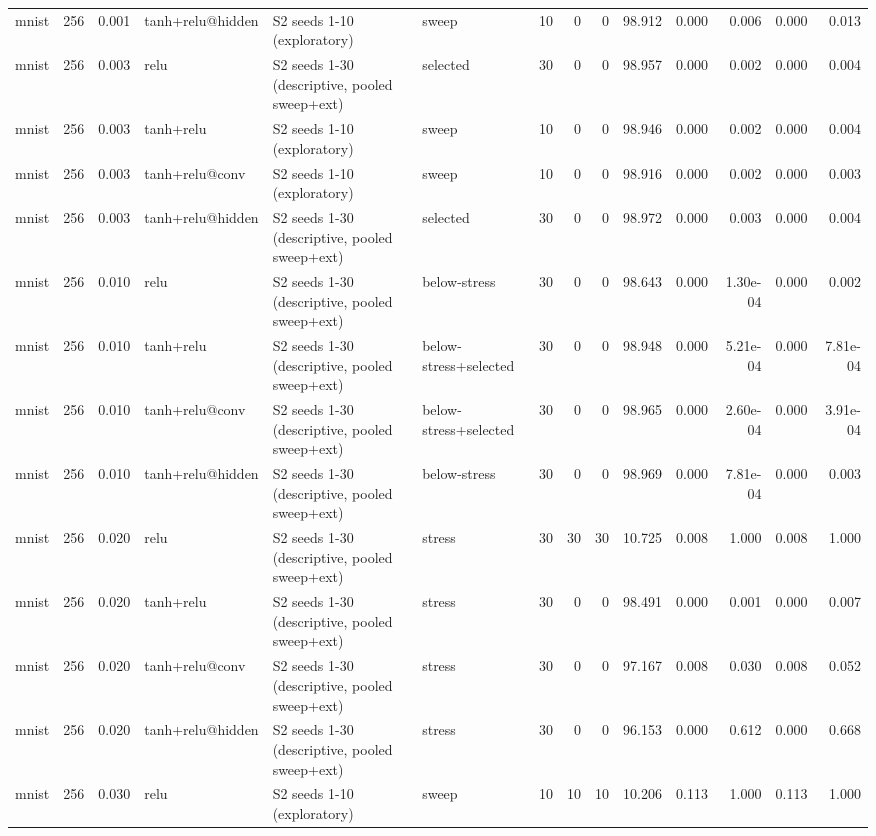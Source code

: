 \begin{table}[htbp]
{\begin{tabular}{@{}lrrlllrrrrrrrr@{}}
mnist & 256 & 0.001 & tanh+relu@hidden & S2 seeds 1-10 (exploratory) & sweep & 10 & 0 & 0 & 98.912 & 0.000 & 0.006 & 0.000 & 0.013 \\
mnist & 256 & 0.003 & relu & S2 seeds 1-30 (descriptive, pooled sweep+ext) & selected & 30 & 0 & 0 & 98.957 & 0.000 & 0.002 & 0.000 & 0.004 \\
mnist & 256 & 0.003 & tanh+relu & S2 seeds 1-10 (exploratory) & sweep & 10 & 0 & 0 & 98.946 & 0.000 & 0.002 & 0.000 & 0.004 \\
mnist & 256 & 0.003 & tanh+relu@conv & S2 seeds 1-10 (exploratory) & sweep & 10 & 0 & 0 & 98.916 & 0.000 & 0.002 & 0.000 & 0.003 \\
mnist & 256 & 0.003 & tanh+relu@hidden & S2 seeds 1-30 (descriptive, pooled sweep+ext) & selected & 30 & 0 & 0 & 98.972 & 0.000 & 0.003 & 0.000 & 0.004 \\
mnist & 256 & 0.010 & relu & S2 seeds 1-30 (descriptive, pooled sweep+ext) & below-stress & 30 & 0 & 0 & 98.643 & 0.000 & 1.30e-04 & 0.000 & 0.002 \\
mnist & 256 & 0.010 & tanh+relu & S2 seeds 1-30 (descriptive, pooled sweep+ext) & below-stress+selected & 30 & 0 & 0 & 98.948 & 0.000 & 5.21e-04 & 0.000 & 7.81e-04 \\
mnist & 256 & 0.010 & tanh+relu@conv & S2 seeds 1-30 (descriptive, pooled sweep+ext) & below-stress+selected & 30 & 0 & 0 & 98.965 & 0.000 & 2.60e-04 & 0.000 & 3.91e-04 \\
mnist & 256 & 0.010 & tanh+relu@hidden & S2 seeds 1-30 (descriptive, pooled sweep+ext) & below-stress & 30 & 0 & 0 & 98.969 & 0.000 & 7.81e-04 & 0.000 & 0.003 \\
mnist & 256 & 0.020 & relu & S2 seeds 1-30 (descriptive, pooled sweep+ext) & stress & 30 & 30 & 30 & 10.725 & 0.008 & 1.000 & 0.008 & 1.000 \\
mnist & 256 & 0.020 & tanh+relu & S2 seeds 1-30 (descriptive, pooled sweep+ext) & stress & 30 & 0 & 0 & 98.491 & 0.000 & 0.001 & 0.000 & 0.007 \\
mnist & 256 & 0.020 & tanh+relu@conv & S2 seeds 1-30 (descriptive, pooled sweep+ext) & stress & 30 & 0 & 0 & 97.167 & 0.008 & 0.030 & 0.008 & 0.052 \\
mnist & 256 & 0.020 & tanh+relu@hidden & S2 seeds 1-30 (descriptive, pooled sweep+ext) & stress & 30 & 0 & 0 & 96.153 & 0.000 & 0.612 & 0.000 & 0.668 \\
mnist & 256 & 0.030 & relu & S2 seeds 1-10 (exploratory) & sweep & 10 & 10 & 10 & 10.206 & 0.113 & 1.000 & 0.113 & 1.000 \\

\end{tabular}}
\end{table}
